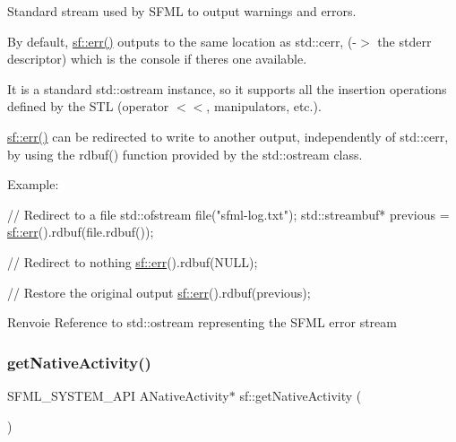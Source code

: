 Standard stream used by S\+F\+ML to output warnings and errors. 

By default, \hyperlink{group__system_ga7fe7f475639e26334606b5142c29551f}{sf\+::err()} outputs to the same location as std\+::cerr, (-\/$>$ the stderr descriptor) which is the console if there\textquotesingle{}s one available.

It is a standard std\+::ostream instance, so it supports all the insertion operations defined by the S\+TL (operator $<$$<$, manipulators, etc.).

\hyperlink{group__system_ga7fe7f475639e26334606b5142c29551f}{sf\+::err()} can be redirected to write to another output, independently of std\+::cerr, by using the rdbuf() function provided by the std\+::ostream class.

Example\+: 
\begin{DoxyCode}
\textcolor{comment}{// Redirect to a file}
std::ofstream file(\textcolor{stringliteral}{"sfml-log.txt"});
std::streambuf* previous = \hyperlink{group__system_ga7fe7f475639e26334606b5142c29551f}{sf::err}().rdbuf(file.rdbuf());

\textcolor{comment}{// Redirect to nothing}
\hyperlink{group__system_ga7fe7f475639e26334606b5142c29551f}{sf::err}().rdbuf(NULL);

\textcolor{comment}{// Restore the original output}
\hyperlink{group__system_ga7fe7f475639e26334606b5142c29551f}{sf::err}().rdbuf(previous);
\end{DoxyCode}


\begin{DoxyReturn}{Renvoie}
Reference to std\+::ostream representing the S\+F\+ML error stream 
\end{DoxyReturn}
\mbox{\label{group__system_ga9f5460043bdbd5be0ccccd2e6f0ddc41}} 
\subsubsection{\texorpdfstring{get\+Native\+Activity()}{getNativeActivity()}}
{\footnotesize\ttfamily S\+F\+M\+L\+\_\+\+S\+Y\+S\+T\+E\+M\+\_\+\+A\+PI A\+Native\+Activity$\ast$ sf\+::get\+Native\+Activity (\begin{DoxyParamCaption}{ }\end{DoxyParamCaption})}



